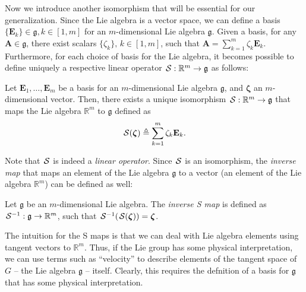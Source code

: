 Now we introduce another isomorphism that will be essential for our generalization. Since the Lie algebra is a vector space, we can define a basis $\{\mathbf{E}_k\}\in\mathfrak{g}, k\in[1,m]$ for an $m$-dimensional Lie algebra $\mathfrak{g}$. Given a basis, for any $\mathbf{A} \in\mathfrak{g}$, there exist scalars $\{\zeta_k\},\, k\in[1,m]$, such that $\mathbf{A} = \sum_{k=1}^{m} \zeta_k\mathbf{E}_k$. Furthermore, for each choice of basis for the Lie algebra, it becomes possible to define uniquely a respective linear operator $\SL:\mathbb{R}^{m}\to\mathfrak{g}$ as follows:
\begin{definition}[S map]\label{def:SL-left-isomorphism-act-on-xi}
    Let $\mathbf{E}_1,\dots,\mathbf{E}_m$ be a basis for an $m$-dimensional Lie algebra $\mathfrak{g}$, and $\boldsymbol{\zeta}$ an $m$-dimensional vector. Then, there exists a unique isomorphism $\SL:\mathbb{R}^{m}\to\mathfrak{g}$ that maps the Lie algebra $\mathbb{R}^m$ to $\mathfrak{g}$ defined as
    \begin{align}
        \SL[\boldsymbol{\zeta}] \triangleq \sum_{k=1}^m\zeta_k\mathbf{E}_k.    
    \end{align}
\end{definition}
Note that $\SL$ is indeed a \emph{linear operator}. Since $\SL$ is an isomorphism, the \emph{inverse map} that maps an element of the Lie algebra $\mathfrak{g}$ to a vector (an element of the Lie algebra $\mathbb{R}^m$) can be defined as well:
\begin{definition}\label{def:inverse-isomorphism-SLinv}
    Let $\mathfrak{g}$ be an $m$-dimensional Lie algebra. The \emph{inverse S map} is defined as $\invSL:\mathfrak{g}\to\mathbb{R}^m$, such that $\invSL[\SL[\boldsymbol{\zeta}]] = \boldsymbol{\zeta}$. 
\end{definition}
The intuition for the S maps is that we can deal with Lie algebra elements using tangent vectors to $\mathbb{R}^m$. Thus, if the Lie group has some physical interpretation, we can use terms such as ``velocity'' to describe elements of the tangent space of $G$ -- the Lie algebra $\mathfrak{g}$ -- itself. Clearly, this requires the defnition of a basis for $\mathfrak{g}$ that has some physical interpretation.
